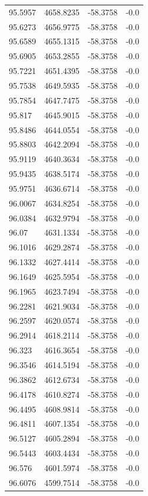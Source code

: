 \begin{table}[H]
\begin{tabular}{llll}
95.5957 & 4658.8235 & -58.3758 & -0.0 \\
95.6273 & 4656.9775 & -58.3758 & -0.0 \\
95.6589 & 4655.1315 & -58.3758 & -0.0 \\
95.6905 & 4653.2855 & -58.3758 & -0.0 \\
95.7221 & 4651.4395 & -58.3758 & -0.0 \\
95.7538 & 4649.5935 & -58.3758 & -0.0 \\
95.7854 & 4647.7475 & -58.3758 & -0.0 \\
95.817 & 4645.9015 & -58.3758 & -0.0 \\
95.8486 & 4644.0554 & -58.3758 & -0.0 \\
95.8803 & 4642.2094 & -58.3758 & -0.0 \\
95.9119 & 4640.3634 & -58.3758 & -0.0 \\
95.9435 & 4638.5174 & -58.3758 & -0.0 \\
95.9751 & 4636.6714 & -58.3758 & -0.0 \\
96.0067 & 4634.8254 & -58.3758 & -0.0 \\
96.0384 & 4632.9794 & -58.3758 & -0.0 \\
96.07 & 4631.1334 & -58.3758 & -0.0 \\
96.1016 & 4629.2874 & -58.3758 & -0.0 \\
96.1332 & 4627.4414 & -58.3758 & -0.0 \\
96.1649 & 4625.5954 & -58.3758 & -0.0 \\
96.1965 & 4623.7494 & -58.3758 & -0.0 \\
96.2281 & 4621.9034 & -58.3758 & -0.0 \\
96.2597 & 4620.0574 & -58.3758 & -0.0 \\
96.2914 & 4618.2114 & -58.3758 & -0.0 \\
96.323 & 4616.3654 & -58.3758 & -0.0 \\
96.3546 & 4614.5194 & -58.3758 & -0.0 \\
96.3862 & 4612.6734 & -58.3758 & -0.0 \\
96.4178 & 4610.8274 & -58.3758 & -0.0 \\
96.4495 & 4608.9814 & -58.3758 & -0.0 \\
96.4811 & 4607.1354 & -58.3758 & -0.0 \\
96.5127 & 4605.2894 & -58.3758 & -0.0 \\
96.5443 & 4603.4434 & -58.3758 & -0.0 \\
96.576 & 4601.5974 & -58.3758 & -0.0 \\
96.6076 & 4599.7514 & -58.3758 & -0.0 \\

\end{tabular}
\end{table}
